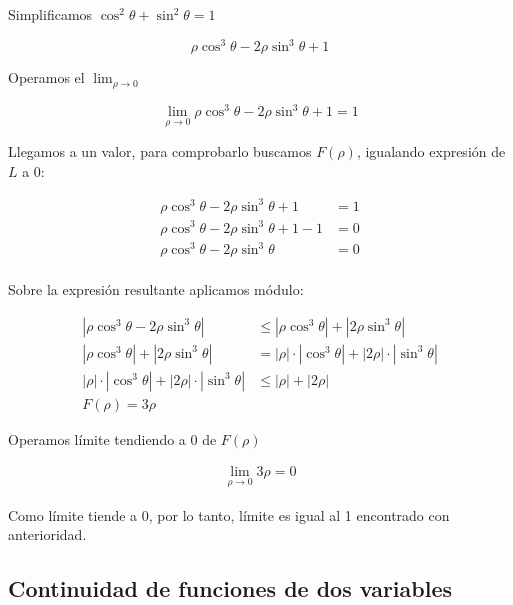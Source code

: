 Simplificamos \(\cos^{2}\theta + \sin^{2}\theta = 1\)

\begin{equation*}
    \rho\cos^{3}\theta - 2\rho\sin^{3}\theta + 1
\end{equation*}

Operamos el \(\lim_{\rho\to0}\)

\begin{equation*}
    \lim_{\rho\to0}\rho\cos^{3}\theta - 2\rho\sin^{3}\theta + 1 = \boxed{1}
\end{equation*}

Llegamos a un valor, para comprobarlo buscamos \(F(\rho)\),
igualando expresión de \(L\) a 0:

\begin{align*}
    \rho\cos^{3}\theta - 2\rho\sin^{3}\theta + 1     & = 1 \\
    \rho\cos^{3}\theta - 2\rho\sin^{3}\theta + 1 - 1 & = 0 \\
    \rho\cos^{3}\theta - 2\rho\sin^{3}\theta         & = 0 \\
\end{align*}

Sobre la expresión resultante aplicamos módulo:

\begin{align*}
    |\rho\cos^{3}\theta - 2\rho\sin^{3}\theta|                 & \leq |\rho\cos^{3}\theta| + |2\rho\sin^{3}\theta|            \\
    |\rho\cos^{3}\theta| + |2\rho\sin^{3}\theta|               & = |\rho|\cdot|\cos^{3}\theta| + |2\rho|\cdot|\sin^{3}\theta| \\
    |\rho|\cdot|\cos^{3}\theta| + |2\rho|\cdot|\sin^{3}\theta| & \leq |\rho| + |2\rho|                                        \\
    \boxed{F(\rho) = 3\rho}
\end{align*}

Operamos límite tendiendo a 0 de \(F(\rho)\)

\begin{align*}
    \lim_{\rho\to0} 3\rho = \boxed{0}
\end{align*}

Como límite tiende a 0, por lo tanto, límite es igual al 1 encontrado con anterioridad.

\subsection{Continuidad de funciones de dos variables}

